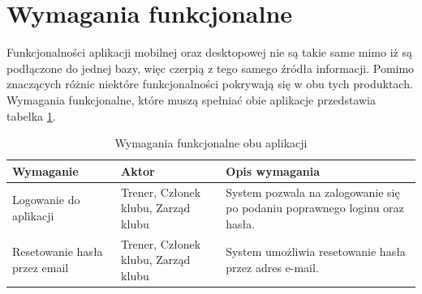 \documentclass[12pt,oneside]{report}
\begin{document}
\section{Wymagania funkcjonalne}
Funkcjonalności aplikacji mobilnej oraz desktopowej nie są takie same mimo iż są podłączone do jednej bazy, więc czerpią z tego samego źródła informacji. Pomimo znaczących różnic niektóre funkcjonalności pokrywają się w obu tych produktach. 
Wymagania funkcjonalne, które muszą spełniać obie aplikacje przedstawia tabelka \ref{funkcjonalneObuApek}.
\begin{table}[H]
	\centering
\begin{tabular}{|p{4.5cm}|p{4cm}|p{7cm}|}			
	\hline
	Wymaganie & Aktor & Opis wymagania\\
	\hline
	Logowanie do aplikacji& Trener, Członek klubu, Zarząd klubu & System pozwala na zalogowanie się po podaniu poprawnego loginu oraz hasła.\\
	\hline
	Resetowanie hasła przez email & Trener, Członek klubu, Zarząd klubu& System umożliwia resetowanie hasła przez adres e-mail. \\
	\hline
	
\end{tabular}
	\caption{Wymagania funkcjonalne obu aplikacji}
	\label{funkcjonalneObuApek}
\end{table}
\end{document}
